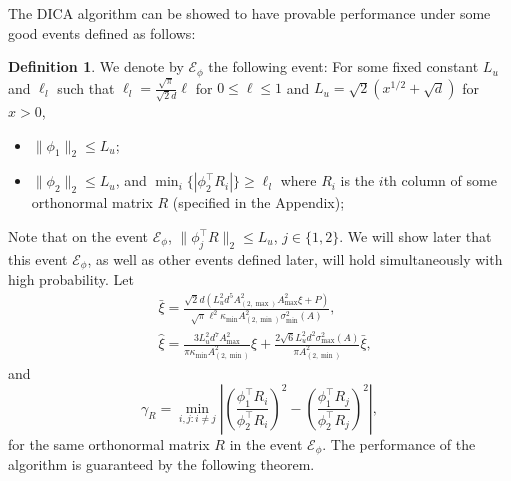 \documentclass[twoside]{article}
\newcommand{\Ephione}{\mathcal{E}_{\phi_1}}
\newcommand{\Ephitwo}{\mathcal{E}_{\phi_2}}
\newcommand{\Ephi}{\mathcal{E}_{\phi}}
\theoremstyle{definition}
\newtheorem{definition}[lemma]{Definition}
\begin{document}
The DICA algorithm can be showed to have provable performance under some good events defined as follows:
\begin{definition}
We denote by $\Ephi$ the following event:
For some fixed constant $L_u$ and $\ell_l$ such that $\ell_l = \frac{\sqrt{\pi}}{\sqrt{2}d}\ell$ for $0\le \ell\le 1$ and $ L_u = \sqrt{2}\left(x^{1/2}+\sqrt{d}\right)$ for $x>0$,
\begin{itemize}
\vspace{-3mm}
\item $\|\phi_1\|_2 \le L_u$;
\item $\|\phi_2\|_2 \le L_u$, and $\min_i \{|\phi_2^{\top}R_i|\} \ge \ell_l$ where $R_i$ is the $i$th column of some orthonormal matrix $R$ (specified in the Appendix);
\end{itemize} 
\end{definition}  
Note that on the event $\Ephi$, $\|\phi_j^{\top}R\|_2\le L_u$, $j\in\{1,2\}$. 
We will show later that this event $\Ephi$, as well as other events defined later, will hold simultaneously with high probability.
Let 
\begin{align*}
& \bar{\xi} =   \frac{\sqrt{2}d\left(L_u^2d^5 A_{(2,\max)}^2A_{\max}^2\xi + P\right)}{\sqrt{\pi}\ell^2\kappa_{\min}A^2_{(2,\min)}\sigma_{\min}^2(A)}, \\
& \widehat{\xi} = \frac{3L_u^2d^7A^2_{\max}}{\pi\kappa_{\min}A^2_{(2,\min)}}\xi + \frac{2\sqrt{6}L_u^2d^2\sigma_{\max}^2(A)}{\pi A^2_{(2,\min)}}\bar{\xi},
\end{align*} 
and 
\begin{equation}
\label{def:gammaR}
\gamma_R =  \min_{i,j: i\neq j} \left\vert \left(\frac{\phi_1^{\top}R_i}{\phi_2^{\top}R_i}\right)^2 - \left(\frac{\phi_1^{\top}R_j}{\phi_2^{\top}R_j}\right)^2 \right\vert, 
\end{equation}
for the same orthonormal matrix $R$ in the event $\Ephi$.
The performance of the algorithm is guaranteed by the following theorem.
\end{document}
